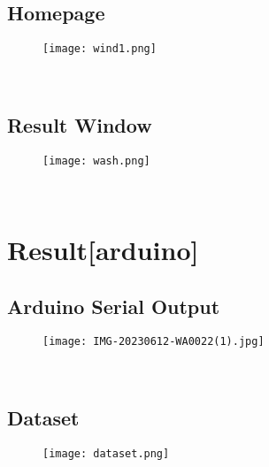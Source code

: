 \documentclass[a4paper,12pt,oneside]{report}
\begin{document}
\section{Homepage}
\begin{figure}[h]
    \centering
    \begin{minipage}{0.5\textwidth}
        \centering
        \texttt{[image: wind1.png]}
        \label{fig:flex-sensor}
    \end{minipage}
\end{figure}
\\
\section{Result Window}
\begin{figure}[h]
    \centering
    \begin{minipage}{0.5\textwidth}
        \centering
        \texttt{[image: wash.png]}
        \label{fig:flex-sensor}
    \end{minipage}
\end{figure}
\\





 
	
	\newpage
	\chapter{Result[arduino]}
	\label{chap:Method}
 \section{Arduino Serial Output}
 \begin{figure}[h]
    \centering
    \begin{minipage}{0.5\textwidth}
        \centering
        \texttt{[image: IMG-20230612-WA0022(1).jpg]}
        \label{fig:flex-sensor}
    \end{minipage}
\end{figure}
\\
\section{Dataset}
 \begin{figure}[h]
    \centering
    \begin{minipage}{0.5\textwidth}
        \centering
        \texttt{[image: dataset.png]}
        \label{fig:flex-sensor}
    \end{minipage}
\end{figure}
\\
 
\end{document}
